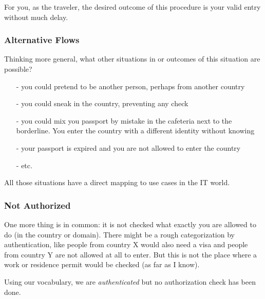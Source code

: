 For you, as the traveler, the desired outcome of this procedure is your
valid entry without much delay.


\subsubsection{Alternative Flows}

Thinking more general, what other situations in or outcomes of this
situation are possible?

\begin{itemize}
    \item[-] you could pretend to be another person, perhaps from another 
        country
    \item[-] you could sneak in the country, preventing any check
    \item[-] you could mix you passport by mistake in the cafeteria next 
        to the borderline.  You enter the country with a different identity 
        without knowing
    \item[-] your passport is expired and you are not allowed to enter the 
        country
    \item[-] etc.
\end{itemize}

All those situations have a direct mapping to use cases in the IT world.

\subsubsection{Not Authorized}

One more thing is in common: it is not checked what exactly you are
allowed to do (in the country or domain). There might be a rough
categorization by authentication, like people from country X would also
need a visa and people from country Y are not allowed at all to enter.
But this is not the place where a work or residence permit would be
checked (as far as I know).

Using our vocabulary, we are \emph{authenticated} but no authorization
check has been done.

